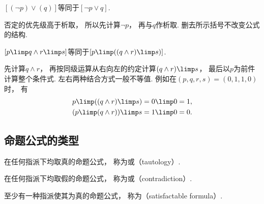 
\begin{example}
\([(\neg p) \lor (q)]\)等同于\([\neg p \lor q]\).
    \begin{solution}
        否定的优先级高于析取，
        所以先计算\(\neg p\)，
        再与\(q\)作析取.
        删去所示括号不改变公式的结构.
    \end{solution}
\end{example}

\begin{example}
    \([p \limp q \land r \limp s]\)等同于\([p \limp ((q \land r) \limp s)]\).
    \begin{solution}
        先计算\(q\land r\)，
        再按同级运算从右向左的约定计算\((q\land r)\limp s\)，
        最后以\(p\)为前件计算整个条件式.
        左右两种结合方式一般不等值.
        例如在\((p,q,r,s)=(0,1,1,0)\)时，
        有
        \begin{align*}
            p\limp((q\land r)\limp s) &= 0\limp0=1, \\
            (p\limp(q\land r))\limp s &= 1\limp0=0.
        \end{align*}
    \end{solution}
\end{example}

\subsection{命题公式的类型}
\begin{definition}
在任何指派下均取真的命题公式，
称为或（tautology）.
\end{definition}

\begin{definition}
在任何指派下均取假的命题公式，
称为或（contradiction）.
\end{definition}

\begin{definition}
至少有一种指派使其为真的命题公式，
称为（satisfactable formula）.
\end{definition}

